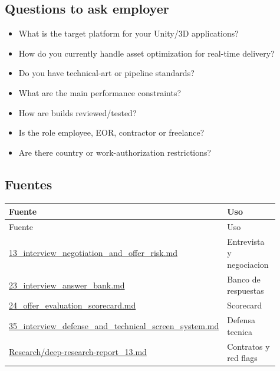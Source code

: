 \subsection{Questions to ask employer}


\begin{itemize}
\item What is the target platform for your Unity/3D applications?
\item How do you currently handle asset optimization for real-time delivery?
\item Do you have technical-art or pipeline standards?
\item What are the main performance constraints?
\item How are builds reviewed/tested?
\item Is the role employee, EOR, contractor or freelance?
\item Are there country or work-authorization restrictions?
\end{itemize}


\subsection{Fuentes}


\begin{center}
\scriptsize
\begin{longtable}{>{\raggedright\arraybackslash}p{0.455\linewidth} >{\raggedright\arraybackslash}p{0.455\linewidth}}
\toprule
Fuente & Uso \\
\midrule
\endfirsthead
\toprule
Fuente & Uso \\
\midrule
\endhead
\href{file:///E:/Laboral/13_interview_negotiation_and_offer_risk.md}{13\_interview\_negotiation\_and\_offer\_risk.md} & Entrevista y negociacion \\
\href{file:///E:/Laboral/23_interview_answer_bank.md}{23\_interview\_answer\_bank.md} & Banco de respuestas \\
\href{file:///E:/Laboral/24_offer_evaluation_scorecard.md}{24\_offer\_evaluation\_scorecard.md} & Scorecard \\
\href{file:///E:/Laboral/35_interview_defense_and_technical_screen_system.md}{35\_interview\_defense\_and\_technical\_screen\_system.md} & Defensa tecnica \\
\href{file:///E:/Laboral/Research/deep-research-report_13.md}{Research/deep-research-report\_13.md} & Contratos y red flags \\
\bottomrule
\end{longtable}
\end{center}
